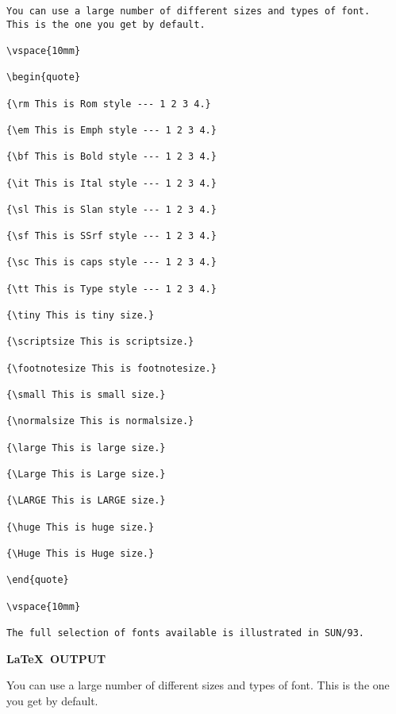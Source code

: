 \begin{verbatim}
You can use a large number of different sizes and types of font.
This is the one you get by default.

\vspace{10mm}

\begin{quote}

{\rm This is Rom style --- 1 2 3 4.}

{\em This is Emph style --- 1 2 3 4.}

{\bf This is Bold style --- 1 2 3 4.}

{\it This is Ital style --- 1 2 3 4.}

{\sl This is Slan style --- 1 2 3 4.}

{\sf This is SSrf style --- 1 2 3 4.}

{\sc This is caps style --- 1 2 3 4.}

{\tt This is Type style --- 1 2 3 4.}

{\tiny This is tiny size.}

{\scriptsize This is scriptsize.}

{\footnotesize This is footnotesize.}

{\small This is small size.}

{\normalsize This is normalsize.}

{\large This is large size.}

{\Large This is Large size.}

{\LARGE This is LARGE size.}

{\huge This is huge size.}

{\Huge This is Huge size.}

\end{quote}

\vspace{10mm}

The full selection of fonts available is illustrated in SUN/93.
\end{verbatim}

\newpage

\begin{center}
{\bf \LaTeX\ OUTPUT}
\end{center}

You can use a large number of different sizes and types of font.
This is the one you get by default.

\vspace{10mm}

